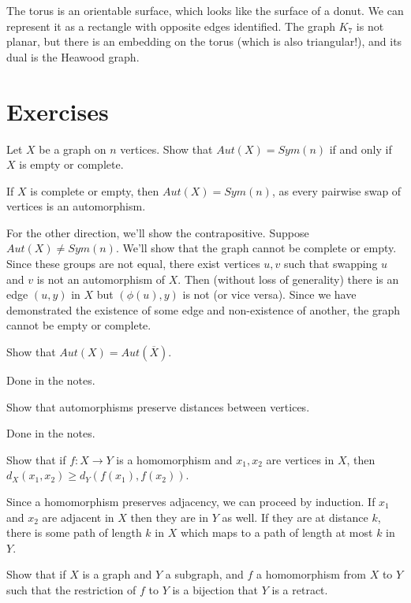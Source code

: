 The torus is an orientable surface, which looks like the surface of a donut.  We can represent it as a rectangle with opposite edges identified.  The graph $K_7$ is not planar, but there is an embedding on the torus (which is also triangular!), and its dual is the Heawood graph.

\section*{Exercises}


 Let $X$ be a graph on $n$ vertices.  Show that $Aut(X)=Sym(n)$ if and only if $X$ is empty or complete.

If $X$ is complete or empty, then $Aut(X)=Sym(n)$, as every pairwise swap of vertices is an automorphism.

For the other direction, we'll show the contrapositive.  Suppose $Aut(X)\neq Sym(n)$.  We'll show that the graph cannot be complete or empty.  Since these groups are not equal, there exist vertices $u,v$ such that swapping $u$ and $v$ is not an automorphism of $X$.  Then (without loss of generality) there is an edge $(u,y)$ in $X$ but $(\phi(u),y)$ is not (or vice versa).  Since we have demonstrated the existence of some edge and non-existence of another, the graph cannot be empty or complete.

 Show that $Aut(X)=Aut(\overline{X})$.

Done in the notes.

  Show that automorphisms preserve distances between vertices.

Done in the notes.


 Show that if $f:X\rightarrow Y$ is a homomorphism and $x_1,x_2$ are vertices in $X$, then $d_X(x_1,x_2)\geq d_Y(f(x_1),f(x_2))$.

Since a homomorphism preserves adjacency, we can proceed by induction.  If $x_1$ and $x_2$ are adjacent in $X$ then they are in $Y$ as well.  If they are at distance $k$, there is some path of length $k$ in $X$ which maps to a path of length at most $k$ in $Y$.


 Show that if $X$ is a graph and $Y$ a subgraph, and $f$ a homomorphism from $X$ to $Y$ such that the restriction of $f$ to $Y$ is a bijection that $Y$ is a retract.